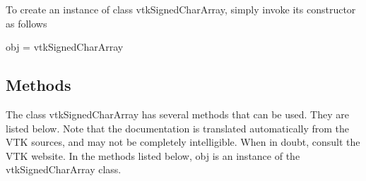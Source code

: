 To create an instance of class vtk\-Signed\-Char\-Array, simply invoke its constructor as follows \begin{DoxyVerb}  obj = vtkSignedCharArray
\end{DoxyVerb}
 \hypertarget{vtkwidgets_vtkxyplotwidget_Methods}{}\subsection{Methods}\label{vtkwidgets_vtkxyplotwidget_Methods}
The class vtk\-Signed\-Char\-Array has several methods that can be used. They are listed below. Note that the documentation is translated automatically from the V\-T\-K sources, and may not be completely intelligible. When in doubt, consult the V\-T\-K website. In the methods listed below, {\ttfamily obj} is an instance of the vtk\-Signed\-Char\-Array class. 
